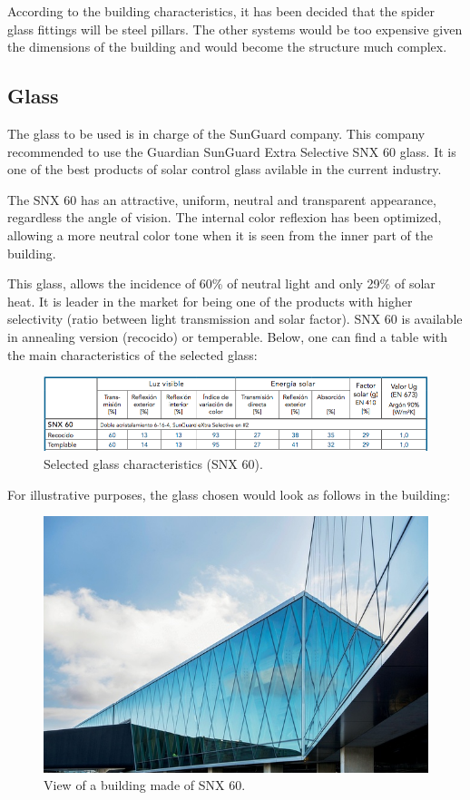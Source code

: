 According to the building characteristics, it has been decided that the spider glass fittings will be steel pillars. The other systems would be too expensive given the dimensions of the building and would become the structure much complex.



		\subsection{Glass}
	The glass to be used is in charge of the SunGuard company. This company recommended to use the Guardian SunGuard Extra Selective SNX 60 glass. It is one of the best products of solar control glass avilable in the current industry.
	
	The SNX 60 has an attractive, uniform, neutral and transparent appearance, regardless the angle of vision. The internal color reflexion has been optimized, allowing a more neutral color tone when it is seen from the inner part of the building. 
	
	This glass, allows the incidence of 60\% of neutral light and only 29\% of solar heat. It is leader in the market for being one of the products with higher selectivity (ratio between light transmission and solar factor). SNX 60 is available in annealing version (recocido) or temperable. Below, one can find a table with the main characteristics of the selected glass:
	
\begin{figure}[H]
\centering
\includegraphics[width=15cm]{./images/Facade/performances}
\caption{Selected glass characteristics (SNX 60).}
\end{figure}

For illustrative purposes, the glass chosen would look as follows in the building:

\begin{figure}[H]
\centering
\includegraphics[width=13cm]{./images/Facade/snx60}
\caption{View of a building made of SNX 60.}
\end{figure}

